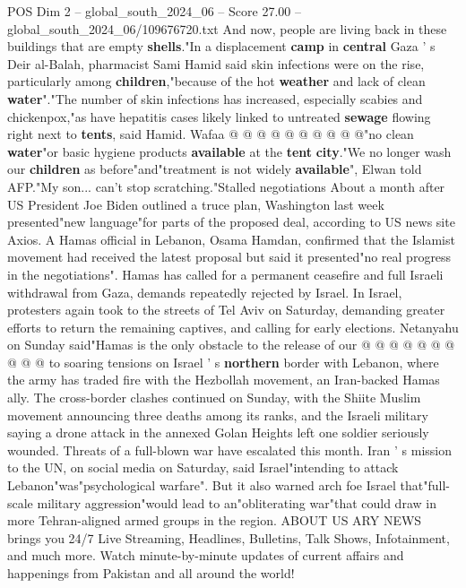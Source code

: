 \begin{textsample}{POS Dim 2 – global\_south\_2024\_06 – Score 27.00 – global\_south\_2024\_06/109676720.txt}
And now, people are living back in these buildings that are empty \textbf{shells}."In a displacement \textbf{camp} in \textbf{central} Gaza ' s Deir al-Balah, pharmacist Sami Hamid said skin infections were on the rise, particularly among \textbf{children},"because of the hot \textbf{weather} and lack of clean \textbf{water}"."The number of skin infections has increased, especially scabies and chickenpox,"as have hepatitis cases likely linked to untreated \textbf{sewage} flowing right next to \textbf{tents}, said Hamid.
Wafaa @ @ @ @ @ @ @ @ @ @"no clean \textbf{water}"or basic hygiene products \textbf{available} at the \textbf{tent} \textbf{city}."We no longer wash our \textbf{children} as before"and"treatment is not widely \textbf{available}", Elwan told AFP."My son... can't stop scratching."Stalled negotiations About a month after US President Joe Biden outlined a truce plan, Washington last week presented"new language"for parts of the proposed deal, according to US news site Axios.
A Hamas official in Lebanon, Osama Hamdan, confirmed that the Islamist movement had received the latest proposal but said it presented"no real progress in the negotiations".
Hamas has called for a permanent ceasefire and full Israeli withdrawal from Gaza, demands repeatedly rejected by Israel.
In Israel, protesters again took to the streets of Tel Aviv on Saturday, demanding greater efforts to return the remaining captives, and calling for early elections.
Netanyahu on Sunday said"Hamas is the only obstacle to the release of our @ @ @ @ @ @ @ @ @ @ to soaring tensions on Israel ' s \textbf{northern} border with Lebanon, where the army has traded fire with the Hezbollah movement, an Iran-backed Hamas ally.
The cross-border clashes continued on Sunday, with the Shiite Muslim movement announcing three deaths among its ranks, and the Israeli military saying a drone attack in the annexed Golan Heights left one soldier seriously wounded.
Threats of a full-blown war have escalated this month.
Iran ' s mission to the UN, on social media on Saturday, said Israel"intending to attack Lebanon"was"psychological warfare".
But it also warned arch foe Israel that"full-scale military aggression"would lead to an"obliterating war"that could draw in more Tehran-aligned armed groups in the region.
ABOUT US ARY NEWS brings you 24/7 Live Streaming, Headlines, Bulletins, Talk Shows, Infotainment, and much more.
Watch minute-by-minute updates of current affairs and happenings from Pakistan and all around the world!

\end{textsample}
